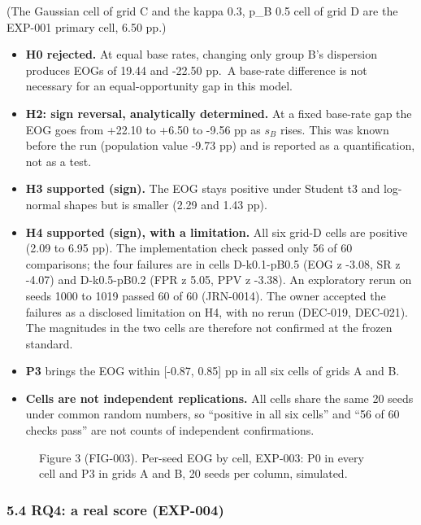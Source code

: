 \documentclass[
]{article}
\makeatletter
\newcommand*\pandocbounded[1]{%
  \sbox\pandoc@box{#1}%
  \Gscale@div\@tempa{\textheight}{\dimexpr\ht\pandoc@box+\dp\pandoc@box\relax}%
  \Gscale@div\@tempb{\linewidth}{\wd\pandoc@box}%
  \ifdim\@tempb\p@<\@tempa\p@\let\@tempa\@tempb\fi%
  \ifdim\@tempa\p@<\p@\scalebox{\@tempa}{\usebox\pandoc@box}%
  \else\usebox{\pandoc@box}%
  \fi%
}
\providecommand{\tightlist}{%
  \setlength{\itemsep}{0pt}\setlength{\parskip}{0pt}}
\makeatother
\begin{document}
(The Gaussian cell of grid C and the kappa 0.3, p\_B 0.5 cell of grid D
are the EXP-001 primary cell, 6.50 pp.)

\begin{itemize}
\tightlist
\item
  \textbf{H0 rejected.} At equal base rates, changing only group B's
  dispersion produces EOGs of 19.44 and -22.50 pp.~A base-rate
  difference is not necessary for an equal-opportunity gap in this
  model.
\item
  \textbf{H2: sign reversal, analytically determined.} At a fixed
  base-rate gap the EOG goes from +22.10 to +6.50 to -9.56 pp as \(s_B\)
  rises. This was known before the run (population value -9.73 pp) and
  is reported as a quantification, not as a test.
\item
  \textbf{H3 supported (sign).} The EOG stays positive under Student t3
  and log-normal shapes but is smaller (2.29 and 1.43 pp).
\item
  \textbf{H4 supported (sign), with a limitation.} All six grid-D cells
  are positive (2.09 to 6.95 pp). The implementation check passed only
  56 of 60 comparisons; the four failures are in cells D-k0.1-pB0.5 (EOG
  z -3.08, SR z -4.07) and D-k0.5-pB0.2 (FPR z 5.05, PPV z -3.38). An
  exploratory rerun on seeds 1000 to 1019 passed 60 of 60 (JRN-0014).
  The owner accepted the failures as a disclosed limitation on H4, with
  no rerun (DEC-019, DEC-021). The magnitudes in the two cells are
  therefore not confirmed at the frozen standard.
\item
  \textbf{P3} brings the EOG within {[}-0.87, 0.85{]} pp in all six
  cells of grids A and B.
\item
  \textbf{Cells are not independent replications.} All cells share the
  same 20 seeds under common random numbers, so ``positive in all six
  cells'' and ``56 of 60 checks pass'' are not counts of independent
  confirmations.
\end{itemize}

\begin{figure}
\centering
\pandocbounded{}
\caption{Figure 3 (FIG-003). Per-seed EOG by cell, EXP-003: P0 in every
cell and P3 in grids A and B, 20 seeds per column, simulated.}
\end{figure}

\subsubsection{5.4 RQ4: a real score
(EXP-004)}\label{rq4-a-real-score-exp-004}
\end{document}
